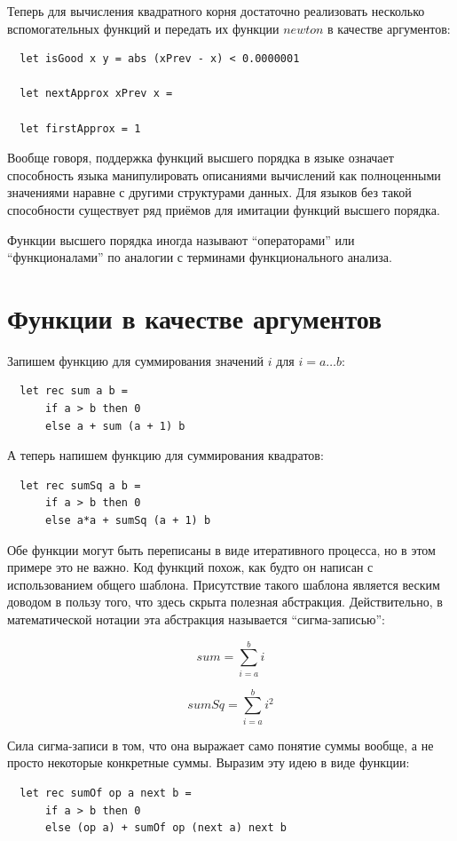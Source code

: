 \documentclass[a4paper,11pt]{article}
\begin{document}
Теперь для вычисления квадратного корня достаточно реализовать несколько
вспомогательных функций и передать их функции $newton$ в качестве аргументов:

\begin{lstlisting}
  let isGood x y = abs (xPrev - x) < 0.0000001

  let nextApprox xPrev x = 

  let firstApprox = 1
\end{lstlisting}

Вообще говоря, поддержка функций высшего порядка в языке означает способность
языка манипулировать описаниями вычислений как полноценными значениями наравне
с другими структурами данных. Для языков без такой способности существует ряд
приёмов для имитации функций высшего порядка.

Функции высшего порядка иногда называют ``операторами'' или ``функционалами''
по аналогии с терминами функционального анализа.

\section{Функции в качестве аргументов}
Запишем функцию для суммирования значений $i$ для $i = a \ldots b$:
\begin{lstlisting}
  let rec sum a b = 
      if a > b then 0
      else a + sum (a + 1) b
\end{lstlisting}

А теперь напишем функцию для суммирования квадратов:
\begin{lstlisting}
  let rec sumSq a b = 
      if a > b then 0
      else a*a + sumSq (a + 1) b
\end{lstlisting}

Обе функции могут быть переписаны в виде итеративного процесса, но в этом
примере это не важно. Код функций похож, как будто он написан с использованием
общего шаблона. Присутствие такого шаблона является веским доводом в пользу
того, что здесь скрыта полезная абстракция. Действительно, в математической
нотации эта абстракция называется ``сигма-записью'':

\begin{equation*}
  sum = \sum_{i=a}^{b} i
\end{equation*}

\begin{equation*}
  sumSq = \sum_{i=a}^{b} i^2
\end{equation*}

Сила сигма-записи в том, что она выражает само понятие суммы вообще, а не
просто некоторые конкретные суммы. Выразим эту идею в виде функции:
\begin{lstlisting}
  let rec sumOf op a next b =
      if a > b then 0
      else (op a) + sumOf op (next a) next b
\end{lstlisting}
\end{document}
